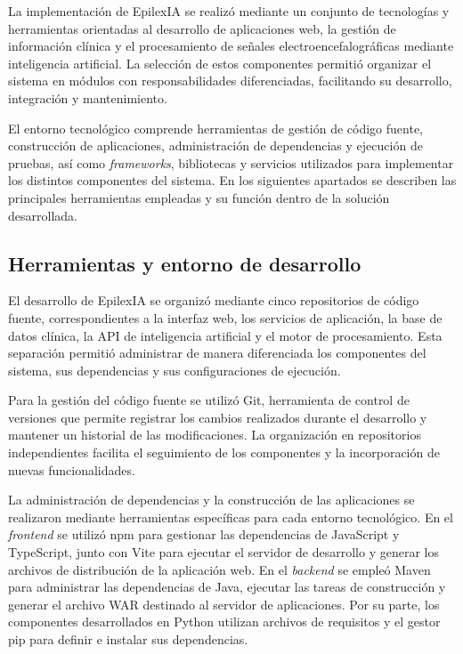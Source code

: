 La implementación de EpilexIA se realizó mediante un conjunto de tecnologías y herramientas orientadas al desarrollo de aplicaciones web, la gestión de información clínica y el procesamiento de señales electroencefalográficas mediante inteligencia artificial. La selección de estos componentes permitió organizar el sistema en módulos con responsabilidades diferenciadas, facilitando su desarrollo, integración y mantenimiento.

El entorno tecnológico comprende herramientas de gestión de código fuente, construcción de aplicaciones, administración de dependencias y ejecución de pruebas, así como \textit{frameworks}, bibliotecas y servicios utilizados para implementar los distintos componentes del sistema. En los siguientes apartados se describen las principales herramientas empleadas y su función dentro de la solución desarrollada.

\subsection{Herramientas y entorno de desarrollo}
\label{herramientas-entorno-desarrollo}

El desarrollo de EpilexIA se organizó mediante cinco repositorios de código fuente, correspondientes a la interfaz web, los servicios de aplicación, la base de datos clínica, la API de inteligencia artificial y el motor de procesamiento. Esta separación permitió administrar de manera diferenciada los componentes del sistema, sus dependencias y sus configuraciones de ejecución.

Para la gestión del código fuente se utilizó Git, herramienta de control de versiones que permite registrar los cambios realizados durante el desarrollo y mantener un historial de las modificaciones. La organización en repositorios independientes facilita el seguimiento de los componentes y la incorporación de nuevas funcionalidades.

La administración de dependencias y la construcción de las aplicaciones se realizaron mediante herramientas específicas para cada entorno tecnológico. En el \textit{frontend} se utilizó npm para gestionar las dependencias de JavaScript y TypeScript, junto con Vite para ejecutar el servidor de desarrollo y generar los archivos de distribución de la aplicación web. En el \textit{backend} se empleó Maven para administrar las dependencias de Java, ejecutar las tareas de construcción y generar el archivo WAR destinado al servidor de aplicaciones. Por su parte, los componentes desarrollados en Python utilizan archivos de requisitos y el gestor pip para definir e instalar sus dependencias.

